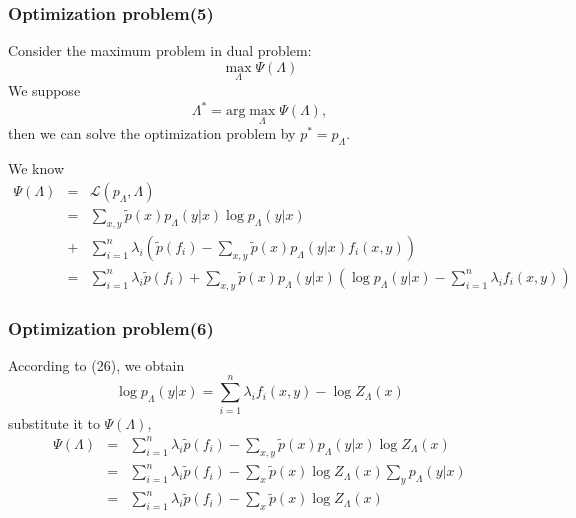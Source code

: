 \documentclass[slidestop,compress,mathserif]{beamer}
\begin{document}
	
	\begin{frame}[shrink]
		\frametitle{Optimization problem(5)}
		Consider the maximum problem in dual problem:
		\begin{equation}
			\max_\Lambda \Psi(\Lambda)
		\end{equation}
		We suppose
		\begin{equation}
			\Lambda^* = \mathrm{arg}\max_\Lambda \Psi(\Lambda),
		\end{equation}
		then we can solve the optimization problem by $p^* = p_\Lambda$.
		
		We know
		\begin{eqnarray*}
			\Psi(\Lambda) &=& \mathcal{L}(p_\Lambda,\Lambda)\\
			&=&\sum_{x,y}\widetilde{p}(x)p_\Lambda(y|x)\log p_\Lambda(y|x) \\
			&+& \sum_{i=1}^{n}\lambda_i\left(\widetilde{p}(f_i) - \sum_{x,y}\widetilde{p}(x)p_\Lambda(y|x)f_i(x,y)\right)\\
			&=& \sum_{i=1}^{n} \lambda_i\widetilde{p}(f_i) +\sum_{x,y}\widetilde{p}(x)p_\Lambda(y|x)\left(\log p_\Lambda(y|x) - \sum_{i=1}^{n}\lambda_if_i(x,y)\right)
		\end{eqnarray*}
	\end{frame}
	
	\begin{frame}
		\frametitle{Optimization problem(6)}
		According to (26), we obtain
		\begin{equation}
			\log p_\Lambda(y|x) = \sum_{i=1}^{n}\lambda_i f_i(x,y) - \log Z_\Lambda(x)
		\end{equation}
		substitute it to $\Psi(\Lambda)$,
		\begin{eqnarray*}
			\Psi(\Lambda) &=& \sum_{i=1}^{n}\lambda_i\widetilde{p}(f_i)-\sum_{x,y}\widetilde{p}(x)p_\Lambda(y|x)\log Z_\Lambda(x) \\
			&=& \sum_{i=1}^{n}\lambda_i\widetilde{p}(f_i) - \sum_x \widetilde{p}(x)\log Z_\Lambda(x)\sum_y p_\Lambda(y|x)\\
			&=& \sum_{i=1}^{n}\lambda_i\widetilde{p}(f_i) - \sum_x\widetilde{p}(x)\log Z_\Lambda(x)
		\end{eqnarray*}
	\end{frame}
	
\end{document}
